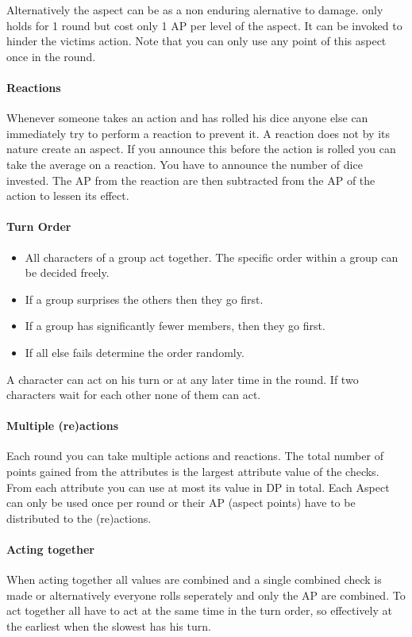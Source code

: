 \documentclass[11pt]{article}
\begin{document}
{Alternatively the aspect can be  as a non enduring alernative to damage.  only holds for 1 round but cost only 1 AP per level of the aspect. It can be invoked to hinder the victims action. Note that you can only use any point of this aspect once in the round. 
\paragraph*{Reactions}
\label{sec:org3963c72}
Whenever someone takes an action and has rolled his dice anyone else can immediately try to perform a reaction to prevent it. A reaction does not by its nature create an aspect. If you announce this before the action is rolled you can take the average on a reaction. You have to announce the number of dice invested. The AP from the reaction are then subtracted from the AP of the action to lessen its effect.
\paragraph*{Turn Order}
\label{sec:orgf12a3c7}
\begin{itemize}
\item All characters of a group act together. The specific order within a group can be decided freely.
\item If a group surprises the others then they go first.
\item If a group has significantly fewer members, then they go first.
\item If all else fails determine the order randomly.
\end{itemize}

A character can act on his turn or at any later time in the round. If two characters wait for each other none of them can act.
\paragraph*{Multiple (re)actions}
\label{sec:orgec95a27}
Each round you can take multiple actions and reactions. The total number of points gained from the attributes is the largest attribute value of the checks. From each attribute you can use at most its value in DP in total. Each Aspect can only be used once per round or their AP (aspect points) have to be distributed to the (re)actions.
\paragraph*{Acting together}
\label{sec:org9280bf9}
When acting together all values are combined and a single combined check is made or alternatively everyone rolls seperately and only the AP are combined. To act together all have to act at the same time in the turn order, so effectively at the earliest when the slowest has his turn.
}
\end{document}
